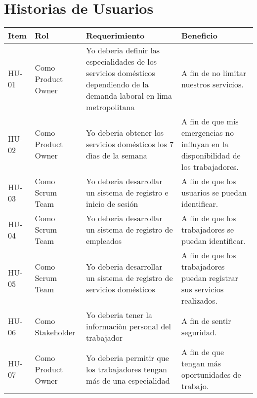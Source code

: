 \chapter{Historias de Usuarios}
\begin{tabular}{ |p{1.25cm}|p{2.5cm}|p{5.5cm}|p{3.5cm}| }
	\hline
	\rowcolor{blue!40}  \textbf{Item}  & \textbf{Rol}  & \textbf{Requerimiento} & \textbf{Beneficio}   \\  \hline
	
	\centering HU-01 &  Como Product Owner  & Yo deberia definir las especialidades de los servicios domésticos dependiendo de la demanda laboral en lima metropolitana  &  A fin de no limitar nuestros servicios.  \\   \hline
	\centering HU-02 & Como Product Owner &  Yo deberia obtener los servicios domésticos los 7 dìas de la semana  & A fin de que mis emergencias no influyan en la disponibilidad de los trabajadores.  \\   \hline
	\centering HU-03 & Como Scrum Team &  Yo deberia desarrollar un sistema de registro e inicio de sesión & A fin de que los usuarios se puedan identificar.  \\   \hline
	\centering HU-04 & Como Scrum Team &  Yo deberia desarrollar un sistema de registro de empleados & A fin de que los trabajadores se puedan identificar.  \\   \hline
	\centering HU-05 & Como Scrum Team &  Yo deberia desarrollar un sistema de registro de servicios domésticos & A fin de que los trabajadores puedan registrar sus servicios realizados.  \\   \hline
	\centering HU-06 & Como Stakeholder &  Yo deberia tener la informaciòn personal del trabajador  & A fin de sentir seguridad.  \\   \hline
	\centering HU-07 & Como Product Owner &  Yo deberia permitir que los trabajadores tengan más de una especialidad  & A fin de que tengan más oportunidades de trabajo.  \\   \hline
	
\end{tabular}